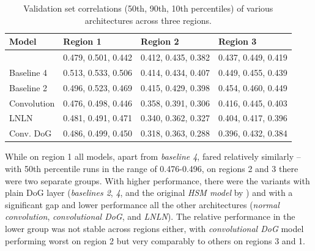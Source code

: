 \setlength{\abovecaptionskip}{10pt plus 0pt minus 0pt} %
\begin{table}[H]
    \renewcommand{\arraystretch}{1.0}
    \centering
    \begin{tabular}{l|l|l|l}
        \toprule
        \textbf{Model} & \textbf{Region 1} & \textbf{Region 2} & \textbf{Region 3} \\ \midrule
        \citeauthor{antolik} & 0.479, 0.501, 0.442 & 0.412, 0.435, 0.382 & 0.437, 0.449, 0.419 \\ 
        Baseline 4 & 0.513, 0.533, 0.506 & 0.414, 0.434, 0.407 & 0.449, 0.455, 0.439 \\ 
        Baseline 2 & 0.496, 0.523, 0.469 & 0.415, 0.429, 0.398 & 0.454, 0.460, 0.449 \\ 
        Convolution & 0.476, 0.498, 0.446 & 0.358, 0.391, 0.306 & 0.416, 0.445, 0.403 \\ 
        LNLN & 0.481, 0.491, 0.471 & 0.340, 0.362, 0.327 & 0.404, 0.417, 0.396 \\ 
        Conv. DoG & 0.486, 0.499, 0.450 & 0.318, 0.363, 0.288 & 0.396, 0.432, 0.384 \\ \bottomrule
    \end{tabular}
    \caption[Performance of various models across regions]{Validation set correlations (50th, 90th, 10th percentiles) of various architectures across three regions.}
    \label{tab:5.3.2.1}
    \renewcommand{\arraystretch}{1.0}
\end{table}
\setlength{\abovecaptionskip}{0pt plus 0pt minus 0pt} %

While on {region 1} all models, apart from \textit{baseline 4}, fared relatively similarly -- with 50th percentile runs in the range of 0.476-0.496, on {regions 2} and {3} there were two separate groups. With higher performance, there were the variants with plain DoG layer (\textit{baselines 2}, \textit{4}, and the original \textit{HSM model} by \cite{antolik}) and with a significant gap and lower performance all the other architectures (\textit{normal convolution}, \textit{convolutional DoG}, and \textit{LNLN}). The relative performance in the lower group was not stable across regions either, with \textit{convolutional DoG} model performing worst on {region 2} but very comparably to others on {regions 3} and {1}. 

